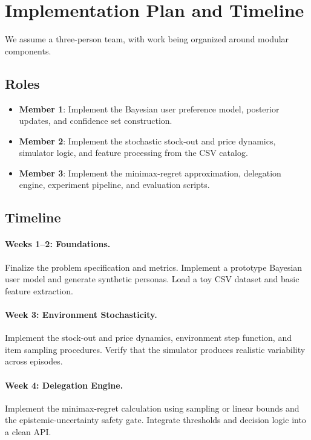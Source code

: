 \documentclass[11pt]{article}
\begin{document}
\section{Implementation Plan and Timeline}

We assume a three-person team, with work being organized around modular components.

\subsection{Roles}

\begin{itemize}
    \item \textbf{Member 1}: Implement the Bayesian user preference model, posterior updates, and confidence set construction.
    \item \textbf{Member 2}: Implement the stochastic stock-out and price dynamics, simulator logic, and feature processing from the CSV catalog.
    \item \textbf{Member 3}: Implement the minimax-regret approximation, delegation engine, experiment pipeline, and evaluation scripts.
\end{itemize}

\subsection{Timeline}

\paragraph{Weeks 1--2: Foundations.} Finalize the problem specification and metrics. Implement a prototype Bayesian user model and generate synthetic personas. Load a toy CSV dataset and basic feature extraction.

\paragraph{Week 3: Environment Stochasticity.} Implement the stock-out and price dynamics, environment step function, and item sampling procedures. Verify that the simulator produces realistic variability across episodes.

\paragraph{Week 4: Delegation Engine.} Implement the minimax-regret calculation using sampling or linear bounds and the epistemic-uncertainty safety gate. Integrate thresholds and decision logic into a clean API.
\end{document}
